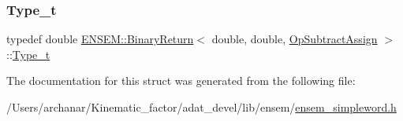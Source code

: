 \mbox{\label{structENSEM_1_1BinaryReturn_3_01double_00_01double_00_01OpSubtractAssign_01_4_ace697e1191a85ef3c635e6d0d147e1b3}} 
\subsubsection{\texorpdfstring{Type\_t}{Type\_t}\hspace{0.1cm}{\footnotesize\ttfamily [2/2]}}
{\footnotesize\ttfamily typedef double \mbox{\hyperlink{structENSEM_1_1BinaryReturn}{E\+N\+S\+E\+M\+::\+Binary\+Return}}$<$ double, double, \mbox{\hyperlink{structENSEM_1_1OpSubtractAssign}{Op\+Subtract\+Assign}} $>$\+::\mbox{\hyperlink{structENSEM_1_1BinaryReturn_3_01double_00_01double_00_01OpSubtractAssign_01_4_ace697e1191a85ef3c635e6d0d147e1b3}{Type\+\_\+t}}}



The documentation for this struct was generated from the following file\+:\begin{DoxyCompactItemize}
\item 
/\+Users/archanar/\+Kinematic\+\_\+factor/adat\+\_\+devel/lib/ensem/\mbox{\hyperlink{lib_2ensem_2ensem__simpleword_8h}{ensem\+\_\+simpleword.\+h}}\end{DoxyCompactItemize}

